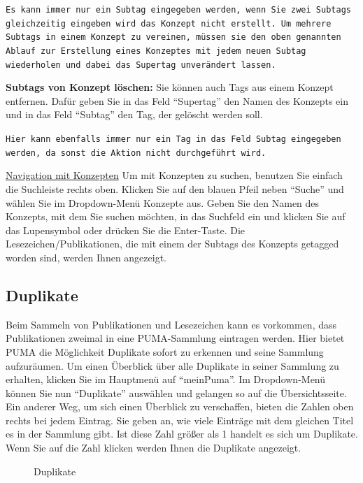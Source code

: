 \begin{description}
\begin{mdframed}[style=mdfexample1,frametitle={\texttt{ACHTUNG}},backgroundcolor=gray!40]\texttt{Es kann immer nur ein Subtag eingegeben werden, wenn Sie zwei Subtags gleichzeitig eingeben wird das Konzept nicht erstellt. Um mehrere Subtags in einem Konzept zu vereinen, müssen sie den oben genannten Ablauf zur Erstellung eines Konzeptes mit jedem neuen Subtag wiederholen und dabei das Supertag unverändert lassen.} 
\end{mdframed}
\textbf{Subtags von Konzept löschen:} Sie können auch Tags aus einem Konzept entfernen. Dafür geben Sie in das Feld \enquote{Supertag} den Namen des Konzepts ein und in das Feld \enquote{Subtag} den Tag, der gelöscht werden soll. 
\begin{mdframed}[style=mdfexample1,frametitle={\texttt{ACHTUNG}},backgroundcolor=gray!40]\texttt{Hier kann ebenfalls immer nur ein Tag in das Feld Subtag eingegeben werden, da sonst die Aktion nicht durchgeführt wird.}
\end{mdframed}
\underline{Navigation mit Konzepten}
\newline
Um mit Konzepten zu suchen, benutzen Sie einfach die Suchleiste rechts oben. Klicken Sie auf den blauen Pfeil neben \enquote{Suche} und wählen Sie im Dropdown-Menü Konzepte aus. Geben Sie den Namen des Konzepts, mit dem Sie suchen möchten, in das Suchfeld ein und klicken Sie auf das Lupensymbol oder drücken Sie die Enter-Taste. Die Lesezeichen/Publikationen, die mit einem der Subtags des Konzepts getagged worden sind, werden Ihnen angezeigt. 
\subsection{Duplikate}
Beim Sammeln von Publikationen und Lesezeichen kann es vorkommen, dass Publikationen zweimal in eine PUMA-Sammlung eintragen werden. Hier bietet PUMA die Möglichkeit Duplikate sofort zu erkennen und seine Sammlung aufzuräumen. Um einen Überblick über alle Duplikate in seiner Sammlung zu erhalten, klicken Sie im Hauptmenü auf \enquote{meinPuma}. Im Dropdown-Menü können Sie nun \enquote{Duplikate} auswählen und gelangen so auf die Übersichtsseite. Ein anderer Weg, um sich einen Überblick zu verschaffen, bieten die Zahlen oben rechts bei jedem Eintrag. Sie geben an, wie viele Einträge mit dem gleichen Titel es in der Sammlung gibt. Ist diese Zahl größer als 1 handelt es sich um Duplikate. Wenn Sie auf die Zahl klicken werden Ihnen die Duplikate angezeigt.
\begin{figure}[h!]
 \centering
 \caption{Duplikate}
 \label{figure027}
\end{figure}

\end{description}
